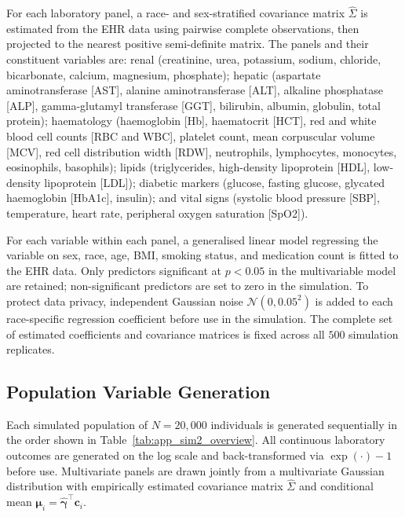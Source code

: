For each laboratory panel, a race- and sex-stratified covariance matrix $\hat{\Sigma}$ is estimated from the EHR data using pairwise complete observations, then projected to the nearest positive semi-definite matrix. The panels and their constituent variables are: renal (creatinine, urea, potassium, sodium, chloride, bicarbonate, calcium, magnesium, phosphate); hepatic (aspartate aminotransferase [AST], alanine aminotransferase [ALT], alkaline phosphatase [ALP], gamma-glutamyl transferase [GGT], bilirubin, albumin, globulin, total protein); haematology (haemoglobin [Hb], haematocrit [HCT], red and white blood cell counts [RBC and WBC], platelet count, mean corpuscular volume [MCV], red cell distribution width [RDW], neutrophils, lymphocytes, monocytes, eosinophils, basophils); lipids (triglycerides, high-density lipoprotein [HDL], low-density lipoprotein [LDL]); diabetic markers (glucose, fasting glucose, glycated haemoglobin [HbA1c], insulin); and vital signs (systolic blood pressure [SBP], temperature, heart rate, peripheral oxygen saturation [SpO2]).

For each variable within each panel, a generalised linear model regressing the variable on sex, race, age, BMI, smoking status, and medication count is fitted to the EHR data. Only predictors significant at $p < 0.05$ in the multivariable model are retained; non-significant predictors are set to zero in the simulation. To protect data privacy, independent Gaussian noise $\mathcal{N}(0, 0.05^2)$ is added to each race-specific regression coefficient before use in the simulation. The complete set of estimated coefficients and covariance matrices is fixed across all $500$ simulation replicates.

\subsection{Population Variable Generation}
\label{app:sim2_popgen}

Each simulated population of $N = 20{,}000$ individuals is generated sequentially in the order shown in Table~\ref{tab:app_sim2_overview}. All continuous laboratory outcomes are generated on the log scale and back-transformed via $\exp(\cdot) - 1$ before use. Multivariate panels are drawn jointly from a multivariate Gaussian distribution with empirically estimated covariance matrix $\hat{\Sigma}$ and conditional mean $\boldsymbol{\mu}_i = \hat{\boldsymbol{\gamma}}^{\top}\mathbf{c}_i$.

